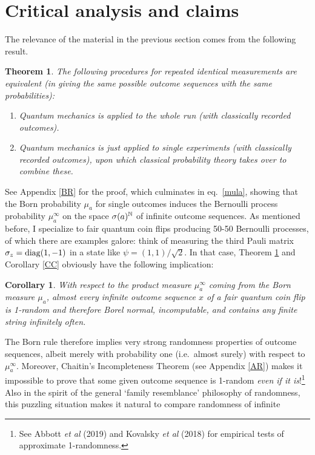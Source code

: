 \documentclass[11pt,a4paper]{article}
\numberwithin{equation}{section}
\newcommand{\er}{\eqref}
\newcommand{\N}{{\mathbb N}} \newcommand{\R}{{\mathbb R}}
\newtheorem{theorem}[definition]{Theorem}
\newtheorem{corollary}[definition]{Corollary}
\begin{document}
 \section{Critical analysis and claims}\label{CAC}
 The relevance of the material in the previous section comes from the following result.
  \begin{theorem}\label{ET}
  The following procedures for repeated identical measurements  are equivalent (in giving the same possible outcome sequences with the same  probabilities):
 \begin{enumerate}
 \item {Quantum mechanics is  applied to the whole run (with classically recorded outcomes).}
\item {Quantum mechanics is just applied to single experiments (with classically recorded outcomes), upon which classical probability theory takes over to combine these.} 
\end{enumerate}
 \end{theorem}
See Appendix \ref{BR} for the proof, which culminates in eq.\ \er{mula}, showing that the Born probability $\mu_a$ for single outcomes induces the Bernoulli process probability $\mu_a^{\infty}$ on the space $\sg(a)^{\N}$ of infinite outcome sequences. As mentioned before, I specialize to fair quantum coin flips producing 50-50 Bernoulli processes, of which there are examples galore: think of
measuring the third Pauli matrix $\sigma_z=\mathrm{diag}(1,-1)$ in a state like $\psi=(1,1)/\sqrt{2}$. In that case,
Theorem \ref{ET} and Corollary \ref{CC} obviously have the following implication:
\begin{corollary}\label{CC2}
With respect to the product measure
 $\mu_a^{\infty}$ coming from the Born measure $\mu_a$, almost every infinite outcome sequence $x$ of a  fair  quantum coin flip is 1-random and therefore Borel normal, incomputable,
  and contains any finite string infinitely often.
 \end{corollary}
The Born rule therefore implies very strong randomness properties of outcome sequences, albeit merely with probability one (i.e.\ almost surely) with respect to $\mu_a^{\infty}$. Moreover, Chaitin's Incompleteness Theorem (see Appendix \ref{AR}) makes it impossible to prove that some given outcome sequence is 1-random \emph{even if it is}!\footnote{See
Abbott \emph{et al} (2019) and Kovalsky \emph{et al} (2018) for empirical tests of approximate 1-randomness.}
Also  in the spirit of the general `family resemblance' philosophy of randomness, this puzzling situation makes it natural to compare  randomness of infinite 
\end{document}
